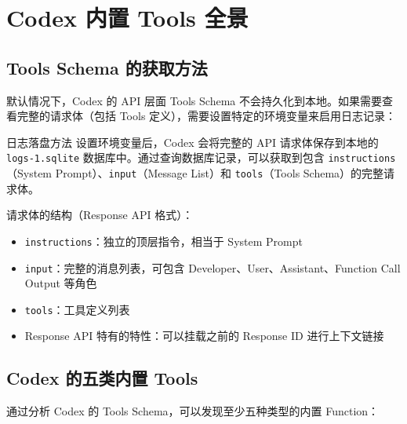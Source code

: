 \section{Codex 内置 Tools 全景}

\subsection{Tools Schema 的获取方法}

默认情况下，Codex 的 API 层面 Tools Schema 不会持久化到本地。如果需要查看完整的请求体（包括 Tools 定义），需要设置特定的环境变量来启用日志记录：

\begin{warningbox}{日志落盘方法}
设置环境变量后，Codex 会将完整的 API 请求体保存到本地的 \texttt{logs-1.sqlite} 数据库中。通过查询数据库记录，可以获取到包含 \texttt{instructions}（System Prompt）、\texttt{input}（Message List）和 \texttt{tools}（Tools Schema）的完整请求体。
\end{warningbox}

请求体的结构（Response API 格式）：

\begin{itemize}
    \item \texttt{instructions}：独立的顶层指令，相当于 System Prompt
    \item \texttt{input}：完整的消息列表，可包含 Developer、User、Assistant、Function Call Output 等角色
    \item \texttt{tools}：工具定义列表
    \item Response API 特有的特性：可以挂载之前的 Response ID 进行上下文链接
\end{itemize}

\subsection{Codex 的五类内置 Tools}

通过分析 Codex 的 Tools Schema，可以发现至少五种类型的内置 Function：

